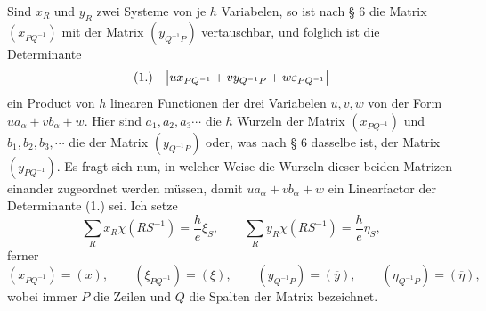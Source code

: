 \documentclass[11pt]{article}
\makeatletter
\newcommand{\frobtagc}[2]{\[\begin{array}{@{}r@{\quad}c@{}}\textup{(#1)} & \displaystyle #2\end{array}\]}
\makeatother
\begin{document}
Sind $x_R$ und $y_R$ zwei Systeme von je $h$ Variabelen, so ist nach § 6 die Matrix $(x_{PQ^{-1}})$ mit der Matrix $(y_{Q^{-1}P})$ vertauschbar, und folglich ist die Determinante
\frobtagc{1.}{\left|ux_{PQ^{-1}}+vy_{Q^{-1}P}+w\varepsilon_{PQ^{-1}}\right|}
ein Product von $h$ linearen Functionen der drei Variabelen $u,v,w$ von der Form $ua_\alpha+vb_\alpha+w$. Hier sind $a_1,a_2,a_3\cdots$ die $h$ Wurzeln der Matrix $(x_{PQ^{-1}})$ und $b_1,b_2,b_3,\cdots$ die der Matrix $(y_{Q^{-1}P})$ oder, was nach § 6 dasselbe ist, der Matrix $(y_{PQ^{-1}})$. Es fragt sich nun, in welcher Weise die Wurzeln dieser beiden Matrizen einander zugeordnet werden müssen, damit $ua_\alpha+vb_\alpha+w$ ein Linearfactor der Determinante (1.) sei. Ich setze
\[
\sum_R x_R\chi(RS^{-1})=\frac{h}{e}\xi_S,
\qquad
\sum_R y_R\chi(RS^{-1})=\frac{h}{e}\eta_S,
\]
ferner
\[
(x_{PQ^{-1}})=(x),\qquad (\xi_{PQ^{-1}})=(\xi),\qquad (y_{Q^{-1}P})=(\overline{y}),\qquad (\eta_{Q^{-1}P})=(\overline{\eta}),
\]
wobei immer $P$ die Zeilen und $Q$ die Spalten der Matrix bezeichnet.
\end{document}
